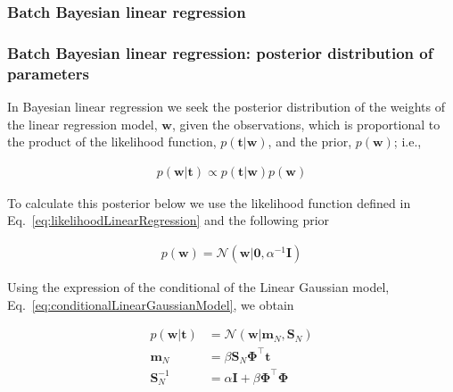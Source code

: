 \documentclass[11pt]{beamer}
\begin{document}
\subsubsection{Batch Bayesian linear regression}

\begin{frame}
    \frametitle{Batch Bayesian linear regression: posterior distribution of parameters}

	\scriptsize
	In Bayesian linear regression we seek the posterior distribution of the
weights of the linear regression model, $\mathbf{w}$, given the observations, which
is proportional to the product of the likelihood function,
$p(\mathbf{t}|\mathbf{w})$, and the prior, $p(\mathbf{w})$; i.e., 

	\begin{align}
		p(\mathbf{w}|\mathbf{t})\propto
        p(\mathbf{t}|\mathbf{w})p(\mathbf{w})\label{eq:priorLinearRegression}
	\end{align}

	To calculate this posterior below we use the likelihood function defined in
Eq.~\ref{eq:likelihoodLinearRegression} and the following prior

	\begin{align*}
		p(\mathbf{w})=\mathcal{N}(\mathbf{w}|\mathbf{0},\alpha^{-1}\mathbf{I})
	\end{align*}

	Using the expression of the conditional of the Linear Gaussian model,
Eq.~\ref{eq:conditionalLinearGaussianModel}, we obtain

	\begin{align}
		p(\mathbf{w}|\mathbf{t})&=\mathcal{N}(\mathbf{w}|\mathbf{m}_N,\mathbf{S}_N)\nonumber\\
		\mathbf{m}_N&=\beta\mathbf{S}_N\boldsymbol{\Phi}^\intercal\mathbf{t}\label{eq:blrPosteriorMean}\\
		\mathbf{S}_N^{-1}&=\alpha\mathbf{I}+\beta\boldsymbol{\Phi}^\intercal\boldsymbol{\Phi}\label{eq:blrPosteriorCov}
	\end{align}

	\normalsize
\end{frame}
\end{document}
